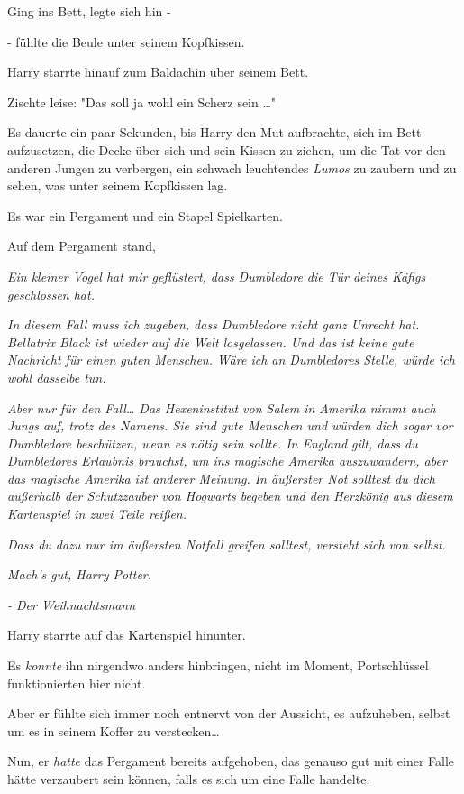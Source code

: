 {Ging ins Bett, legte sich hin -

- fühlte die Beule unter seinem Kopfkissen.

Harry starrte hinauf zum Baldachin über seinem Bett.

Zischte leise: "Das soll ja wohl ein Scherz sein …"

Es dauerte ein paar Sekunden, bis Harry den Mut aufbrachte, sich im Bett aufzusetzen, die Decke über sich und sein Kissen zu ziehen, um die Tat vor den anderen Jungen zu verbergen, ein schwach leuchtendes \emph{Lumos} zu zaubern und zu sehen, was unter seinem Kopfkissen lag.

Es war ein Pergament und ein Stapel Spielkarten.

Auf dem Pergament stand,

\emph{Ein kleiner Vogel hat mir geflüstert, dass Dumbledore die Tür deines Käfigs geschlossen hat.}

\emph{In diesem Fall muss ich zugeben, dass Dumbledore nicht ganz Unrecht hat. Bellatrix Black ist wieder auf die Welt losgelassen. Und das ist keine gute Nachricht für einen guten Menschen. Wäre ich an Dumbledores Stelle, würde ich wohl dasselbe tun.}

\emph{\emph{Aber nur für den Fall… Das Hexeninstitut von Salem in Amerika nimmt auch Jungs auf, trotz des Namens. Sie sind gute Menschen und würden dich sogar vor Dumbledore beschützen, wenn es nötig sein sollte. In England gilt, dass} \emph{du} \emph{Dumbledores Erlaubnis brauchst, um ins magische Amerika auszuwandern, aber das magische Amerika ist anderer Meinung. In} \emph{äußerster Not} \emph{solltest du} \emph{dich außerhalb der} \emph{Schutzzauber} \emph{von Hogwarts begeben und den Herzkönig aus diesem Kartenspiel in zwei Teile reißen.}}

\emph{Dass du dazu nur im äußersten Notfall greifen solltest, versteht sich von selbst.}

\emph{Mach's gut, Harry Potter.}

\emph{- Der Weihnachtsmann}

Harry starrte auf das Kartenspiel hinunter.

Es \emph{konnte} ihn nirgendwo anders hinbringen, nicht im Moment, Portschlüssel funktionierten hier nicht.

Aber er fühlte sich immer noch entnervt von der Aussicht, es aufzuheben, selbst um es in seinem Koffer zu verstecken…

Nun, er \emph{hatte} das Pergament bereits aufgehoben, das genauso gut mit einer Falle hätte verzaubert sein können, falls es sich um eine Falle handelte.

}

